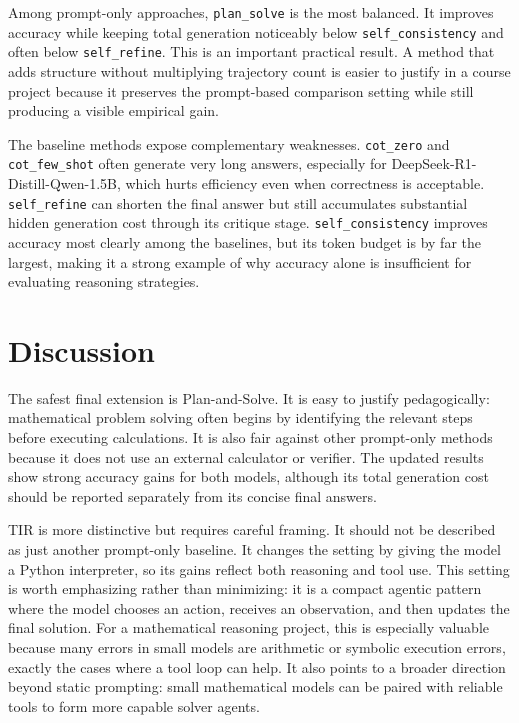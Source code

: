 \documentclass[conference]{IEEEtran}
\newcommand{\deepseek}{DeepSeek-R1-Distill-Qwen-1.5B}
\begin{document}
Among prompt-only approaches, \texttt{plan\_solve} is the most balanced. It improves accuracy while keeping total generation noticeably below \texttt{self\_consistency} and often below \texttt{self\_refine}. This is an important practical result. A method that adds structure without multiplying trajectory count is easier to justify in a course project because it preserves the prompt-based comparison setting while still producing a visible empirical gain.

The baseline methods expose complementary weaknesses. \texttt{cot\_zero} and \texttt{cot\_few\_shot} often generate very long answers, especially for \deepseek{}, which hurts efficiency even when correctness is acceptable. \texttt{self\_refine} can shorten the final answer but still accumulates substantial hidden generation cost through its critique stage. \texttt{self\_consistency} improves accuracy most clearly among the baselines, but its token budget is by far the largest, making it a strong example of why accuracy alone is insufficient for evaluating reasoning strategies.

\section{Discussion}
The safest final extension is Plan-and-Solve. It is easy to justify pedagogically: mathematical problem solving often begins by identifying the relevant steps before executing calculations. It is also fair against other prompt-only methods because it does not use an external calculator or verifier. The updated results show strong accuracy gains for both models, although its total generation cost should be reported separately from its concise final answers.

TIR is more distinctive but requires careful framing. It should not be described as just another prompt-only baseline. It changes the setting by giving the model a Python interpreter, so its gains reflect both reasoning and tool use. This setting is worth emphasizing rather than minimizing: it is a compact agentic pattern where the model chooses an action, receives an observation, and then updates the final solution. For a mathematical reasoning project, this is especially valuable because many errors in small models are arithmetic or symbolic execution errors, exactly the cases where a tool loop can help. It also points to a broader direction beyond static prompting: small mathematical models can be paired with reliable tools to form more capable solver agents.
\end{document}
